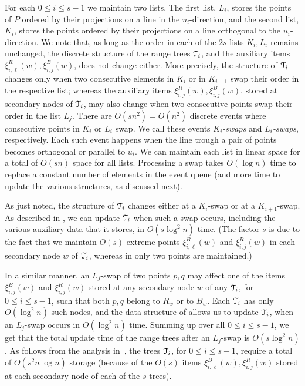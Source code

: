 \documentclass[letter,11pt]{article}
\def\T{\EuScript{T}}
\begin{document}
For each $0\leq i\leq s-1$ we maintain two lists. The first list, $L_i$, stores the
points of $P$ ordered by their projections on a line in the $u_i$-direction, and the second list, $K_i$, stores the points ordered by their projections on a line orthogonal to the $u_i$-direction. We note that, as long as the order in each of the $2s$ lists $K_i,L_i$ remains unchanged, the discrete structure of the range trees $\T_i$, and the auxiliary items $\xi_{i,\ell}^R(w),\xi_{i,j}^B(w)$, does not change either. More precisely, the structure of $\T_i$ changes only when two consecutive elements in $K_i$
or in $K_{i+1}$ swap their order in the respective list; whereas the auxiliary items $\xi_{i,j}^R(w),\xi_{i,j}^B(w)$, stored at secondary nodes of $\T_i$, may also change when two consecutive points swap their order in the list $L_j$. 
There are $O(sn^2)=O(n^2)$ discrete events where consecutive points in $K_i$ or $L_i$
swap. We call these events {\em $K_i$-swaps} and \textit{$L_i$-swaps}, respectively. Each such event happens
when the line trough a pair of points becomes orthogonal or parallel to $u_i$. We
can maintain each list in linear space for a total of $O(sn)$ space
for all lists. Processing a swap takes $O(\log n)$ time to replace a
constant number of elements in the event queue (and more time to update the various structures, as discussed next).


\smallskip

\noindent{\bf The range trees $\T_i$.}
As just noted, the structure of $\T_i$ changes either at a $K_i$-swap or at a
$K_{i+1}$-swap. As described in \cite[Section 4]{KineticNeighbors}, we
can update $\T_i$ when such a swap occurs, including the various auxiliary data that it stores, in $O(s\log^2 n)$ time. 
(The factor $s$ is due to the fact that we maintain
$O(s)$ extreme points $\xi_{i,\ell}^B(w)$ and $\xi_{i,j}^R(w)$ in each
secondary node $w$ of $\T_i$, whereas in \cite{KineticNeighbors} only
two points are maintained.)

In a similar manner, an $L_j$-swap of two points $p,q$ may affect one of the items $\xi_{i,j}^B(w)$
and $\xi_{i,j}^R(w)$ stored at any secondary node $w$ of any $\T_i$, for $0\leq i\leq s-1$, such that both $p,q$ belong to $R_w$ or to $B_w$. Each $\T_i$ has only $O(\log^2n)$ such nodes, and the data structure of \cite{KineticNeighbors} allows us to
update $\T_i$, when an $L_j$-swap occurs in $O(\log^2 n)$ time. Summing up over all $0\leq i\leq s-1$, we get
that the total update time of the range trees after an $L_j$-swap is
$O(s\log^2 n)$.  As follows from the analysis in~\cite[Section 4]{KineticNeighbors}, the
trees $\T_i$, for $0\leq i\leq s-1$, require a total of $O(s^2n\log
n)$ storage (because of the $O(s)$ items
$\xi_{i,\ell}^B(w),\xi_{i,j}^R(w)$ stored at each secondary node of each of the $s$ trees).
\end{document}
